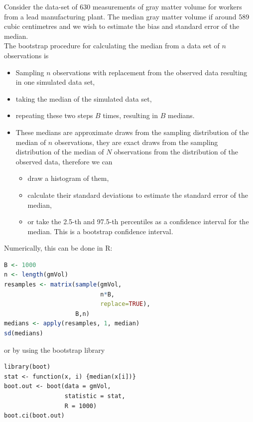 \documentclass{homework}
\begin{document}
\begin{tcolorbox}[title=Example: Using the Jackknife]

Consider the data-set of $630$ measurements of gray matter volume for workers from a lead manufacturing plant. The median gray matter volume if around 589 cubic centimetres and we wish to estimate the bias and standard error of the median. \\

The bootstrap procedure for calculating the median from a data set of $n$ observations is 

\begin{itemize}
    \item Sampling $n$ observations with replacement from the observed data resulting in one simulated data set,
    \item taking the median of the simulated data set,
    \item repeating these two steps $B$ times, resulting in $B$ medians.
    \item These medians are approximate draws from the sampling distribution of the median of $n$ observations, they are exact draws from the sampling distribution of the median of $N$ observations from the distribution of the observed data, therefore we can 
    \begin{itemize}
        \item draw a histogram of them,
        \item calculate their standard deviations to estimate the standard error of the median,
        \item or take the 2.5-th and 97.5-th percentiles as a confidence interval for the median. This is a bootstrap confidence interval. 
    \end{itemize}
\end{itemize}

Numerically, this can be done in R:

\begin{lstlisting}[language=R]
B <- 1000 
n <- length(gmVol)
resamples <- matrix(sample(gmVol, 
                           n*B,
                           replace=TRUE),
                    B,n)
medians <- apply(resamples, 1, median)
sd(medians)
\end{lstlisting}

or by using the bootstrap library

\begin{lstlisting}
library(boot)
stat <- function(x, i) {median(x[i])}
boot.out <- boot(data = gmVol,
                 statistic = stat,
                 R = 1000)
boot.ci(boot.out)
\end{lstlisting}    

\end{tcolorbox}
\end{document}
